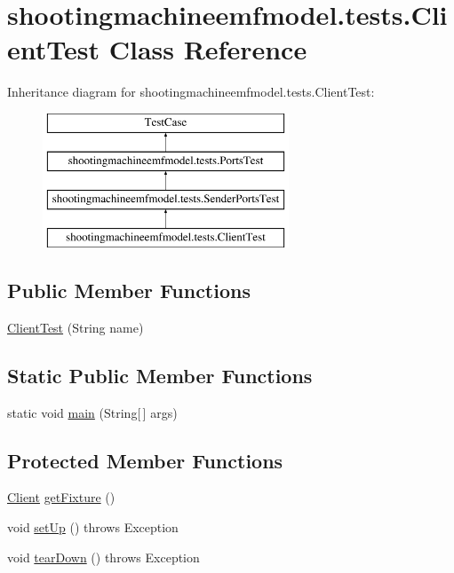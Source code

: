 \hypertarget{classshootingmachineemfmodel_1_1tests_1_1_client_test}{\section{shootingmachineemfmodel.\-tests.\-Client\-Test Class Reference}
\label{classshootingmachineemfmodel_1_1tests_1_1_client_test}
}
Inheritance diagram for shootingmachineemfmodel.\-tests.\-Client\-Test\-:\begin{figure}[H]
\begin{center}
\leavevmode
\includegraphics[height=4.000000cm]{classshootingmachineemfmodel_1_1tests_1_1_client_test}
\end{center}
\end{figure}
\subsection*{Public Member Functions}
\begin{DoxyCompactItemize}
\item 
\hyperlink{classshootingmachineemfmodel_1_1tests_1_1_client_test_a323233b1327f464305363a4598c60601}{Client\-Test} (String name)
\end{DoxyCompactItemize}
\subsection*{Static Public Member Functions}
\begin{DoxyCompactItemize}
\item 
static void \hyperlink{classshootingmachineemfmodel_1_1tests_1_1_client_test_a17496039c42a9dedd7ceb48fdf5c1ea1}{main} (String\mbox{[}$\,$\mbox{]} args)
\end{DoxyCompactItemize}
\subsection*{Protected Member Functions}
\begin{DoxyCompactItemize}
\item 
\hyperlink{interfaceshootingmachineemfmodel_1_1_client}{Client} \hyperlink{classshootingmachineemfmodel_1_1tests_1_1_client_test_ad4085477e31dfd2425c6debeca00fae2}{get\-Fixture} ()
\item 
void \hyperlink{classshootingmachineemfmodel_1_1tests_1_1_client_test_a267964412180851e1c632b1df024146d}{set\-Up} ()  throws Exception 
\item 
void \hyperlink{classshootingmachineemfmodel_1_1tests_1_1_client_test_a52d74d3026dc0670bf24388326ca8822}{tear\-Down} ()  throws Exception 
\end{DoxyCompactItemize}
